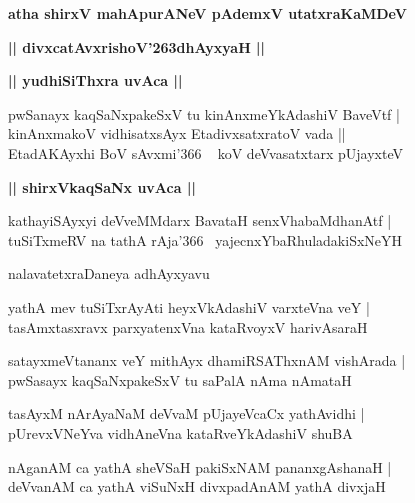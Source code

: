 \documentclass[twoside,12pt,openright]{book}
\def\S{\char'263}
\newcounter{shloka}[chapter]
\def\uvaca#1{\centerline{{\large\textbf{#1}}}}
\begin{document}
\begin{center}
{\LARGE\bfseries atha shirxV mahApurANeV pAdemxV utatxraKaMDeV}
\end{center}

\begin{center}
{\LARGE\bfseries || divxcatAvxrishoV\S dhAyxyaH ||}
\end{center}

\uvaca{|| yudhiSiThxra uvAca ||}

\begin{shloka}%
pwSanayx kaqSaNxpakeSxV tu kinAnxmeYkAdashiV BaveVtf |\\
kinAnxmakoV vidhisatxsAyx EtadivxsatxratoV vada ||\\
EtadAKAyxhi BoV sAvxmi\char'366 ~ koV deVvasatxtarx pUjayxteV
\end{shloka}

\uvaca{|| shirxVkaqSaNx uvAca ||}

\begin{shloka}%
kathayiSAyxyi deVveMMdarx BavataH senxVhabaMdhanAtf |\\
tuSiTxmeRV na tathA rAja\char'366 ~yajecnxYbaRhuladakiSxNeYH
\end{shloka}

\begin{center}
nalavatetxraDaneya adhAyxyavu
\end{center}

\begin{shloka}%
yathA mev tuSiTxrAyAti heyxVkAdashiV varxteVna veY |\\
tasAmxtasxravx parxyatenxVna kataRvoyxV harivAsaraH 
\end{shloka}

\begin{shloka}%
satayxmeVtananx veY mithAyx dhamiRSAThxnAM vishArada |\\
pwSasayx kaqSaNxpakeSxV tu saPalA nAma nAmataH 
\end{shloka}

\begin{shloka}%
tasAyxM nArAyaNaM deVvaM pUjayeVcaCx yathAvidhi |\\
pUrevxVNeYva vidhAneVna kataRveYkAdashiV shuBA
\end{shloka}

\begin{shloka}%
nAganAM ca yathA sheVSaH pakiSxNAM pananxgAshanaH |\\
deVvanAM ca yathA viSuNxH divxpadAnAM yathA divxjaH 
\end{shloka}
\end{document}
